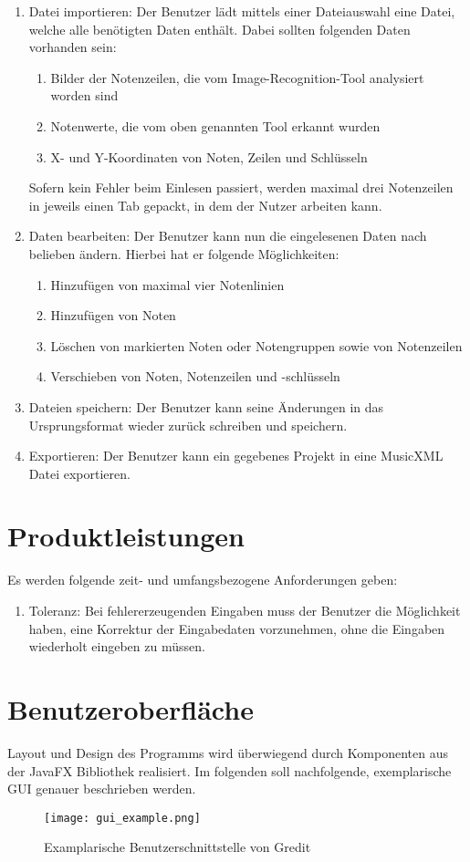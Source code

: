 \documentclass[10pt, paper = a4, oneside,final]{article}
\begin{document}
\begin{enumerate}[label=/F00\arabic*0/]
	\item Datei importieren: Der Benutzer lädt mittels einer Dateiauswahl eine Datei, welche alle benötigten Daten enthält. Dabei sollten folgenden Daten vorhanden sein:
		\begin{enumerate}[label=$\circ$]
			\item Bilder der Notenzeilen, die vom Image-Recognition-Tool analysiert worden sind
			\item Notenwerte, die vom oben genannten Tool erkannt wurden
			\item X- und Y-Koordinaten von Noten, Zeilen und Schlüsseln
		\end{enumerate}
	Sofern kein Fehler beim Einlesen passiert, werden maximal drei Notenzeilen in jeweils einen Tab gepackt, in dem der Nutzer arbeiten kann.
	\item Daten bearbeiten: Der Benutzer kann nun die eingelesenen Daten nach belieben ändern. Hierbei hat er folgende Möglichkeiten:
	\begin{enumerate}[label=$\circ$]
		\item Hinzufügen von maximal vier Notenlinien
		\item Hinzufügen von Noten
		\item Löschen von markierten Noten oder Notengruppen sowie von Notenzeilen
		\item Verschieben von Noten, Notenzeilen und -schlüsseln
	\end{enumerate}
	\item Dateien speichern: Der Benutzer kann seine Änderungen in das Ursprungsformat wieder zurück schreiben und speichern.
	\item Exportieren: Der Benutzer kann ein gegebenes Projekt in eine MusicXML Datei exportieren.
\end{enumerate}

\section{Produktleistungen}
Es werden folgende zeit- und umfangsbezogene Anforderungen geben:
\begin{enumerate}[label=/L\arabic*00/]
	\item Toleranz: Bei fehlererzeugenden Eingaben muss der Benutzer die Möglichkeit haben, eine Korrektur der Eingabedaten vorzunehmen, ohne die Eingaben wiederholt eingeben zu müssen.
\end{enumerate}
\section{Benutzeroberfläche}
Layout und Design des Programms wird überwiegend durch Komponenten aus der JavaFX Bibliothek realisiert. Im folgenden soll nachfolgende, exemplarische GUI genauer beschrieben werden. 
\begin{figure}[h]
	\centering
	\texttt{[image: gui\_example.png]}
	\caption[Bild 1]{Examplarische Benutzerschnittstelle von Gredit}
	\label{fig:guiexample}
\end{figure}
\end{document}

